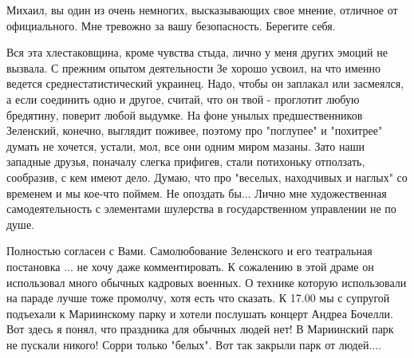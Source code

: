 \begin{itemize}
 
Михаил, вы один из очень немногих, высказывающих свое мнение, отличное от
официального. Мне тревожно за вашу безопасность. Берегите себя.

 

Вся эта хлестаковщина, кроме чувства стыда, лично у меня других эмоций не
вызвала. С прежним опытом деятельности Зе хорошо усвоил, на что именно ведется
среднестатистический украинец. Надо, чтобы он заплакал или засмеялся, а если
соединить одно и другое, считай, что он твой - проглотит любую бредятину,
поверит любой выдумке. На фоне унылых предшественников Зеленский, конечно,
выглядит поживее, поэтому про "поглупее" и "похитрее" думать не хочется,
устали, мол, все они одним миром мазаны. Зато наши западные друзья, поначалу
слегка прифигев, стали потихоньку отползать, сообразив, с кем имеют дело.
Думаю, что про "веселых, находчивых и наглых" со временем и мы кое-что поймем.
Не опоздать бы... Лично мне художественная самодеятельность с элементами
шулерства в государственном управлении не по душе.

 

Полностью согласен с Вами. Самолюбование Зеленского и его театральная
постановка ... не хочу даже комментировать. К сожалению в этой драме он
использовал много обычных кадровых военных. О технике которую использовали на
параде лучше тоже промолчу, хотя есть что сказать. К 17.00 мы с супругой
подъехали к Мариинскому парку и хотели послушать концерт Андреа Бочелли. Вот
здесь я понял, что праздника для обычных людей нет! В Мариинский парк не
пускали никого! Сорри только "белых". Вот так закрыли парк от людей....

 


\end{itemize}

